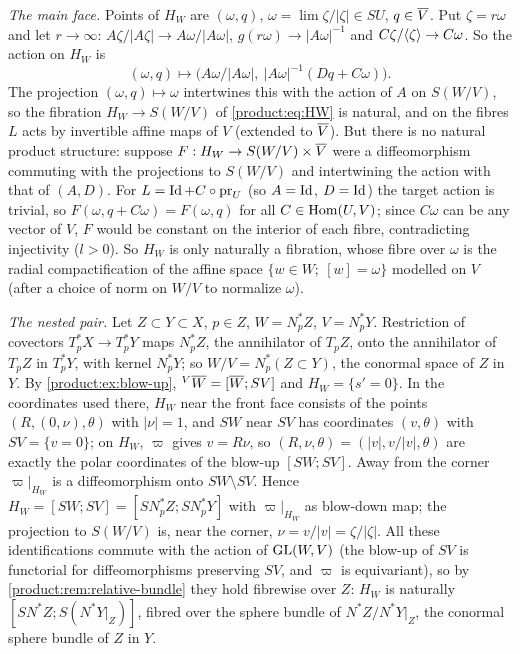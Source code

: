 \emph{The main face.} Points of $H_W$ are $(\omega,q)$, $\omega=\lim\zeta/|\zeta|\in SU$,
$q\in\overline{V}$. Put $\zeta=r\omega$ and let $r\to\infty$: $A\zeta/|A\zeta|\to
A\omega/|A\omega|$, $g(r\omega)\to|A\omega|^{-1}$ and $C\zeta/\langle \zeta\rangle\to C\omega$.
So the action on $H_W$ is
\begin{equation*}
(\omega,q)\longmapsto\big(A\omega/|A\omega|,\ |A\omega|^{-1}(Dq+C\omega)\big).
\end{equation*}
The projection $(\omega,q)\mapsto\omega$ intertwines this with the action of $A$ on
$S(W/V)$, so the fibration $H_W\to S(W/V)$ of \eqref{product:eq:HW} is natural, and
on the fibres $L$ acts by invertible affine maps of $V$ (extended to $\overline{V}$). But
there is no natural product structure: suppose $F:H_W\to S(W/V)\times\overline{V}$ were a
diffeomorphism commuting with the projections to $S(W/V)$ and intertwining the action
with that of $(A,D)$. For $L=\operatorname{Id}+C\circ\mathrm{pr}_U$ (so $A=\operatorname{Id}$, $D=\operatorname{Id}$) the
target action is trivial, so $F(\omega,q+C\omega)=F(\omega,q)$ for all
$C\in\operatorname{Hom}(U,V)$; since $C\omega$ can be any vector of $V$, $F$ would be constant on
the interior of each fibre, contradicting injectivity ($l>0$). So $H_W$ is only
naturally a fibration, whose fibre over $\omega$ is the radial compactification of
the affine space $\{w\in W;\ [w]=\omega\}$ modelled on $V$ (after a choice of norm on
$W/V$ to normalize $\omega$).

\emph{The nested pair.} Let $Z\subset Y\subset X$, $p\in Z$, $W=N^*_pZ$, $V=N^*_pY$.
Restriction of covectors $T^*_pX\to T^*_pY$ maps $N^*_pZ$, the annihilator of
$T_pZ$, onto the annihilator of $T_pZ$ in $T^*_pY$, with kernel $N^*_pY$; so
$W/V=N^*_p(Z\subset Y)$, the conormal space of $Z$ in $Y$. By
\cref{product:ex:blow-up}, ${}^{V}\overline{W}=[\overline{W};SV]$ and $H_W=\{s'=0\}$. In the
coordinates used there, $H_W$ near the front face consists of the points
$(R,(0,\nu),\theta)$ with $|\nu|=1$, and $SW$ near $SV$ has coordinates $(v,\theta)$
with $SV=\{v=0\}$; on $H_W$, $\varpi$ gives $v=R\nu$, so $(R,\nu,\theta)=(|v|,v/|v|,
\theta)$ are exactly the polar coordinates of the blow-up $[SW;SV]$. Away from the
corner $\varpi|_{H_W}$ is a diffeomorphism onto $SW\setminus SV$. Hence
$H_W=[SW;SV]=[SN^*_pZ;SN^*_pY]$ with $\varpi|_{H_W}$ as blow-down map; the
projection to $S(W/V)$ is, near the corner, $\nu=v/|v|=\zeta/|\zeta|$. All these
identifications commute with the action of $\operatorname{GL}(W,V)$ (the blow-up of $SV$ is
functorial for diffeomorphisms preserving $SV$, and $\varpi$ is equivariant), so by
\cref{product:rem:relative-bundle} they hold fibrewise over $Z$: $H_W$ is naturally
$[SN^*Z;S(N^*Y|_Z)]$, fibred over the sphere bundle of $N^*Z/N^*Y|_Z$, the conormal
sphere bundle of $Z$ in $Y$.

